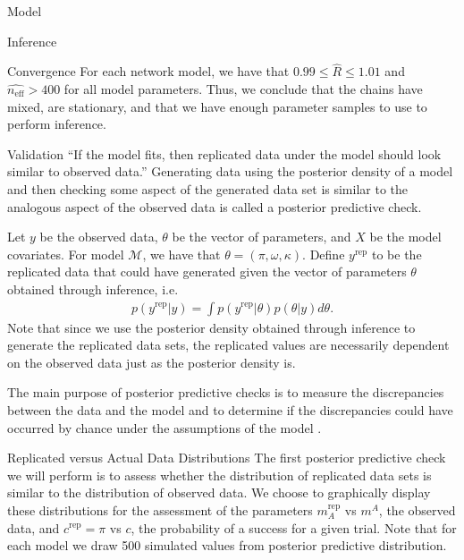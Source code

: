 \begin{chapter}{Model}
\begin{section}{Inference}
\begin{subsection}{Convergence}
    For each network model, we have that $0.99 \leq \hat{R} \leq 1.01$ and $\hat{n_{\text{eff}}} > 400$
    for all model parameters. Thus, we conclude that the chains have mixed, are stationary,
    and that we have enough parameter samples to use to perform inference.
  \end{subsection}

\end{section}

\begin{section}{Validation}
  ``If the model fits, then replicated data under the model should look similar
  to observed data.'' \cite{bda3}
  Generating data using the posterior density of a model and then
  checking some aspect of the generated data set is similar to the analogous aspect
  of the observed data is called a posterior predictive check.

  Let $y$ be the observed data, $\theta$ be the vector of parameters, and $X$ be the model covariates.
  For model $\mathcal{M}$, we have that $\theta = (\pi, \omega, \kappa)$. Define $y^{\text{rep}}$
  to be the replicated data that could have generated given the vector of parameters $\theta$
  obtained through inference, i.e.\
  \begin{align}\label{form:yrep}
    p(y^{\text{rep}} | y) = \int p(y^{\text{rep}}|\theta)p(\theta | y) d\theta.
  \end{align}
  Note that since we use the posterior density obtained through inference to generate the replicated data sets,
  the replicated values are necessarily dependent on the observed data just as the posterior density is.

  The main purpose of posterior predictive checks is to measure the discrepancies between the
  data and the model and to determine if the discrepancies could have occurred by chance under the assumptions
  of the model \cite{bda3, kruschke}.

  \begin{subsection}{Replicated versus Actual Data Distributions}
    The first posterior predictive check we will perform is to assess whether the
    distribution of replicated data sets is similar to the distribution of observed data.
    We choose to graphically display these distributions for the assessment of the parameters
    $m_A^\text{rep}$ vs $m^A$, the observed data, and $c^{\text{rep}} = \pi$ vs $c$, the probability of a success for a given trial.
    Note that for each model we draw 500 simulated values from posterior predictive distribution.


\end{subsection}
\end{section}
\end{chapter}
